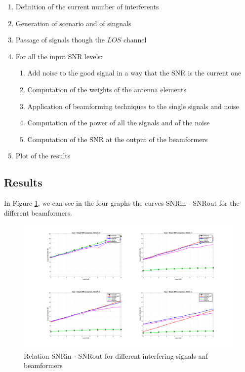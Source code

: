 \begin{enumerate}
    \item Definition of the current number of interferents
    \item Generation of scenario and of singnals
    \item Passage of signals though the $LOS$ channel
    \item For all the input SNR levels:
    \begin{enumerate}
        \item Add noise to the good signal in a way that the SNR is the current one
        \item Computation of the weights of the antenna elements 
        \item Application of beamforming techniques to the single signals and noise
        \item Computation of the power of all the signals and of the noise
        \item Computation of the SNR at the output of the beamformers
    \end{enumerate}
    \item Plot of the results
\end{enumerate}

\subsection{Results}

In Figure \ref{fig:SNR_comparison}, we can see in the four graphs the curves SNRin - SNRout for the different
beamformers.

\begin{figure}[ht]
    \includegraphics[width=\linewidth]{SNR_comparison.png}  
    \caption{Relation SNRin - SNRout for different interfering signals anf beamformers}  
    \label{fig:SNR_comparison}
\end{figure}

